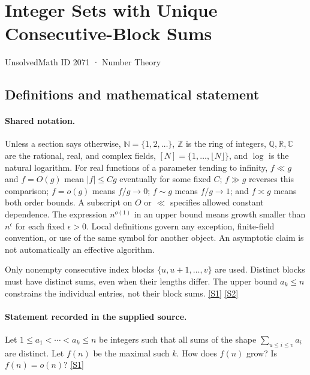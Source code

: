 \documentclass[11pt,a4paper]{article}
\newcommand{\N}{\mathbb{N}}
\newcommand{\Z}{\mathbb{Z}}
\newcommand{\Q}{\mathbb{Q}}
\newcommand{\R}{\mathbb{R}}
\newcommand{\C}{\mathbb{C}}
\newcommand{\sref}[2]{\hyperlink{source:#1:#2}{[S#2]}}
\begin{document}

\setcounter{section}{2070}

\section{Integer Sets with Unique Consecutive-Block Sums}\label{2071}

{\small\sffamily UnsolvedMath ID 2071 · Number Theory}

\subsection{Definitions and mathematical statement}

\paragraph{Shared notation.}Unless a section says otherwise, $\N=\{1,2,\ldots\}$,
$\Z$ is the ring of integers, $\Q,\R,\C$ are the rational, real, and complex
fields, $[N]=\{1,\ldots,\lfloor N\rfloor\}$, and $\log$ is the natural
logarithm. For real functions of a parameter tending to infinity,
$f\ll g$ and $f=O(g)$ mean $|f|\leq Cg$ eventually for some fixed $C$;
$f\gg g$ reverses this comparison; $f=o(g)$ means $f/g\to0$;
$f\sim g$ means $f/g\to1$; and $f\asymp g$ means both order bounds.
A subscript on $O$ or $\ll$ specifies allowed constant dependence.
The expression $n^{o(1)}$ in an upper bound means growth smaller than
$n^\epsilon$ for each fixed $\epsilon>0$. Local definitions govern any
exception, finite-field convention, or use of the same symbol for another
object. An asymptotic claim is not automatically an effective algorithm.



Only nonempty consecutive index blocks $\{u,u+1,\ldots,v\}$ are used. Distinct blocks must have distinct sums, even when their lengths differ. The upper bound $a_k\leq n$ constrains the individual entries, not their block sums. \sref{2071}{1} \sref{2071}{2}

\paragraph{Statement recorded in the supplied source.}
Let $1\leq a_1<\cdots <a_k\leq n$ be integers such that all sums of the shape $\sum_{u\leq i\leq v}a_i$ are distinct. Let $f(n)$ be the maximal such $k$.
How does $f(n)$ grow? Is $f(n)=o(n)$? \sref{2071}{1}
\end{document}
